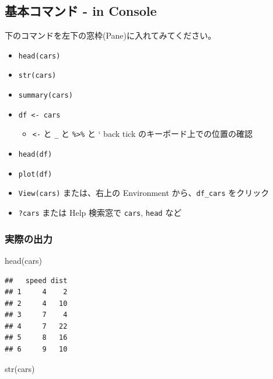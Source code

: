 \documentclass[
]{article}
\newenvironment{Shaded}{\begin{snugshade}}{\end{snugshade}}
\newcommand{\FunctionTok}[1]{\textcolor[rgb]{0.00,0.00,0.00}{#1}}
\newcommand{\NormalTok}[1]{#1}
\providecommand{\tightlist}{%
  \setlength{\itemsep}{0pt}\setlength{\parskip}{0pt}}
\begin{document}
\hypertarget{ux57faux672cux30b3ux30deux30f3ux30c9---in-console}{%
\subsection{基本コマンド - in
Console}\label{ux57faux672cux30b3ux30deux30f3ux30c9---in-console}}

下のコマンドを左下の窓枠(Pane)に入れてみてください。

\begin{itemize}
\tightlist
\item
  \texttt{head(cars)}
\item
  \texttt{str(cars)}
\item
  \texttt{summary(cars)}
\item
  \texttt{df\ \textless{}-\ cars}

  \begin{itemize}
  \tightlist
  \item
    \texttt{\textless{}-} と \texttt{\_} と \texttt{\%\textgreater{}\%}
    と ` back tick のキーボード上での位置の確認
  \end{itemize}
\item
  \texttt{head(df)}
\item
  \texttt{plot(df)}
\item
  \texttt{View(cars)} または、右上の Environment から、\texttt{df\_cars}
  をクリック
\item
  \texttt{?cars} または Help 検索窓で \texttt{cars}, \texttt{head} など
\end{itemize}

\hypertarget{ux5b9fux969bux306eux51faux529b}{%
\subsubsection{実際の出力}\label{ux5b9fux969bux306eux51faux529b}}

\begin{Shaded}
\begin{Highlighting}[]
\FunctionTok{head}\NormalTok{(cars)}
\end{Highlighting}
\end{Shaded}

\begin{verbatim}
##   speed dist
## 1     4    2
## 2     4   10
## 3     7    4
## 4     7   22
## 5     8   16
## 6     9   10
\end{verbatim}

\begin{Shaded}
\begin{Highlighting}[]
\FunctionTok{str}\NormalTok{(cars)}
\end{Highlighting}
\end{Shaded}
\end{document}
